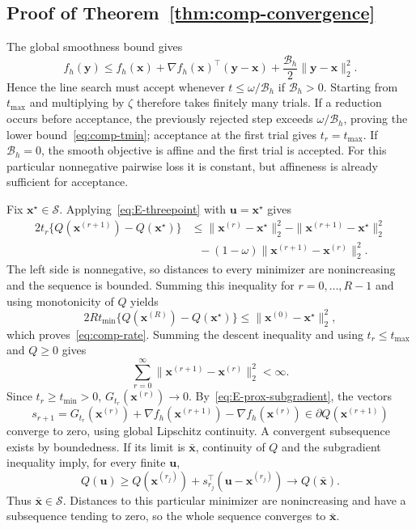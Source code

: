\subsection{Proof of Theorem~\ref{thm:comp-convergence}}
\label{subapp:comp-convergence}
The global smoothness bound gives
\[
 f_h(\bm{y})\le f_h(\bm{x})+\nabla f_h(\bm{x})^\top(\bm{y}-\bm{x})
                          +\frac{\mathscr B_h}{2}\|\bm{y}-\bm{x}\|_2^2.
\]
Hence the line search must accept whenever $t\le\omega/\mathscr B_h$ if $\mathscr B_h>0$. Starting from $t_{\max}$ and multiplying by $\zeta$ therefore takes finitely many trials. If a reduction occurs before acceptance, the previously rejected step exceeds $\omega/\mathscr B_h$, proving the lower bound~\eqref{eq:comp-tmin}; acceptance at the first trial gives $t_r=t_{\max}$. If $\mathscr B_h=0$, the smooth objective is affine and the first trial is accepted. For this particular nonnegative pairwise loss it is constant, but affineness is already sufficient for acceptance.

Fix $\bm{x}^\star\in\mathcal S$. Applying~\eqref{eq:E-threepoint} with $\bm{u}=\bm{x}^\star$ gives
\begin{equation}
 \begin{split}
 2t_r\{Q(\bm{x}^{(r+1)})-Q(\bm{x}^\star)\}
 &\le\|\bm{x}^{(r)}-\bm{x}^\star\|_2^2-\|\bm{x}^{(r+1)}-\bm{x}^\star\|_2^2\\
 &\hspace{8pt}-(1-\omega)\|\bm{x}^{(r+1)}-\bm{x}^{(r)}\|_2^2.
 \end{split}
 \label{eq:E-fejer}
\end{equation}
The left side is nonnegative, so distances to every minimizer are nonincreasing and the sequence is bounded. Summing this inequality for $r=0,\ldots,R-1$ and using monotonicity of $Q$ yields
\[
 2Rt_{\min}\{Q(\bm{x}^{(R)})-Q(\bm{x}^\star)\}
 \le\|\bm{x}^{(0)}-\bm{x}^\star\|_2^2,
\]
which proves~\eqref{eq:comp-rate}. Summing the descent inequality and using $t_r\le t_{\max}$ and $Q\ge0$ gives
\[
 \sum_{r=0}^\infty\|\bm{x}^{(r+1)}-\bm{x}^{(r)}\|_2^2<\infty.
\]
Since $t_r\ge t_{\min}>0$, $G_{t_r}(\bm{x}^{(r)})\to0$. By~\eqref{eq:E-prox-subgradient}, the vectors
\[
 s_{r+1}=G_{t_r}(\bm{x}^{(r)})+
              \nabla f_h(\bm{x}^{(r+1)})-\nabla f_h(\bm{x}^{(r)})
 \in\partial Q(\bm{x}^{(r+1)})
\]
converge to zero, using global Lipschitz continuity. A convergent subsequence exists by boundedness. If its limit is $\bar{\bm{x}}$, continuity of $Q$ and the subgradient inequality imply, for every finite $\bm{u}$,
\[
 Q(\bm{u})\ge Q(\bm{x}^{(r_j)})+s_{r_j}^\top(\bm{u}-\bm{x}^{(r_j)})\longrightarrow Q(\bar{\bm{x}}).
\]
Thus $\bar{\bm{x}}\in\mathcal S$. Distances to this particular minimizer are nonincreasing and have a subsequence tending to zero, so the whole sequence converges to $\bar{\bm{x}}$. 

